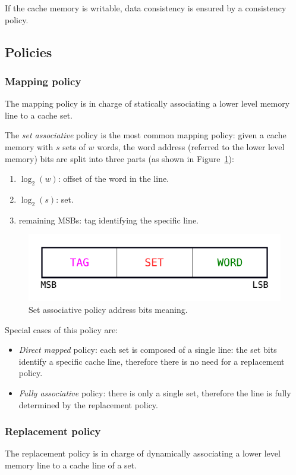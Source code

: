 \documentclass[11pt,a4paper,oneside]{memoir}
\begin{document}
If the cache memory is writable, data consistency is ensured by a consistency
policy.
\subsection{Policies}
\subsubsection{Mapping policy}
The mapping policy is in charge of statically associating a lower level memory
line to a cache set.

The \emph{set associative} policy is the most common mapping policy: given a
cache memory with $s$ sets of $w$ words, the word address (referred to the lower
level memory) bits are split into three parts (as shown in
Figure~\ref{fig:address_partitioning}):
\begin{enumerate}
	\item $\log_2(w)$: offset of the word in the line.
	\item $\log_2(s)$: set.
	\item remaining MSBs: tag identifying the specific line.
\end{enumerate}

\begin{figure}
	\centering
	\includegraphics[width=.5\textwidth]{address_partitioning}
	\caption{Set associative policy address bits meaning.}
	\label{fig:address_partitioning}
\end{figure}

Special cases of this policy are:
\begin{itemize}
	\item \emph{Direct mapped} policy: each set is composed of a single
		line: the set bits identify a specific cache line, therefore
		there is no need for a replacement policy.
	\item \emph{Fully associative} policy: there is only a single set,
		therefore the line is fully determined by the replacement
		policy.
\end{itemize}

\subsubsection{Replacement policy}
The replacement policy is in charge of dynamically associating a lower level
memory line to a cache line of a set.
\end{document}
